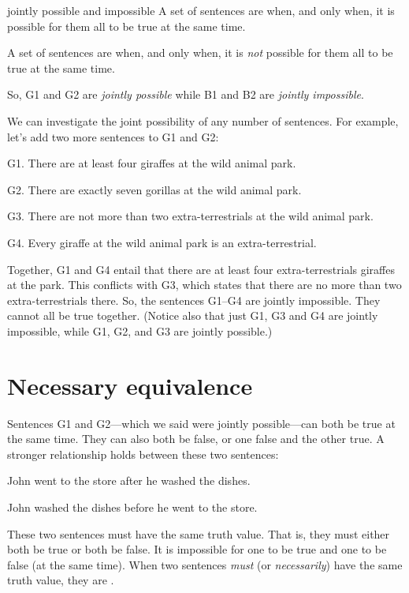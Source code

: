 \begin{factboxy}{jointly possible and impossible}
A set of sentences are  when, and only when, it is possible for them all to be true at the same time.
\medskip

A set of sentences are  when, and only when, it is \textit{not} possible for them all to be true at the same time.
\end{factboxy}
\noindent So, G1 and G2 are \textit{jointly possible} while B1 and B2 are \emph{jointly impossible}.

We can investigate the joint possibility of any number of sentences. For example, let's add two more sentences to G1 and G2:
	\begin{ebullet}	
		\item[G1.] There are at least four giraffes at the wild animal park.
		\item[G2.] There are exactly seven gorillas at the wild animal park.
		\item[G3.] There are not more than two extra-terrestrials at the wild animal park.
		\item[G4.] Every giraffe at the wild animal park is an extra-terrestrial.
	\end{ebullet}
Together, G1 and G4 entail that there are at least four extra-terrestrials giraffes at the park. This conflicts with G3, which states that there are no more than two extra-terrestrials there. So, the sentences G1--G4 are jointly impossible. They cannot all be true together. (Notice also that just G1, G3 and G4 are jointly impossible, while G1, G2, and G3 are jointly possible.)


\section{Necessary equivalence}

Sentences G1 and G2---which we said were jointly possible---can both be true at the same time. They can also both be false, or one false and the other true. A stronger relationship holds between these two sentences:

\begin{earg}
\item[] John went to the store after he washed the dishes.
\item[] John washed the dishes before he went to the store.
\end{earg}
These two sentences must have the same truth value. That is, they must either both be true or both be false. It is impossible for one to be true and one to be false (at the same time).
When two sentences \textit{must} (or \textit{necessarily}) have the same truth value, they are .

